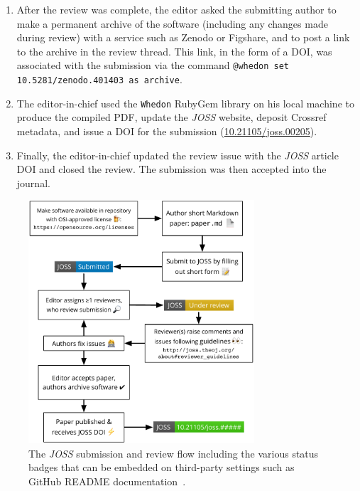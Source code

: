 \documentclass{article}
\newcommand\joss{\textit{JOSS}}
\begin{document}
\begin{enumerate}
\item After the review was complete, the editor asked the submitting author to make a permanent archive of the software (including any changes made during review) with a service such as Zenodo or Figshare, and to post a link to the archive in the review thread. This link, in the form of a DOI, was associated with the submission via the command \texttt{@whedon set 10.5281/zenodo.401403 as archive}.

\item The editor-in-chief used the \texttt{Whedon} RubyGem library on his local machine to produce the compiled PDF, update the \joss{} website, deposit Crossref metadata, and issue a DOI for the submission (\href{https://doi.org/10.21105/joss.00205}{10.21105/joss.00205}).

\item Finally, the editor-in-chief updated the review issue with the \joss{} article DOI and closed the review. The submission was then accepted into the journal.

\end{enumerate}


\begin{figure}[htp]
\centering
\includegraphics[width=0.75\textwidth]{JOSS-flowchart.pdf}
\caption{The \joss{} submission and review flow including the various status badges that can be embedded on third-party settings such as GitHub README documentation~\cite{JOSS-publication-workflow}.
\label{fig:submission-flow}}
\end{figure}
\end{document}
